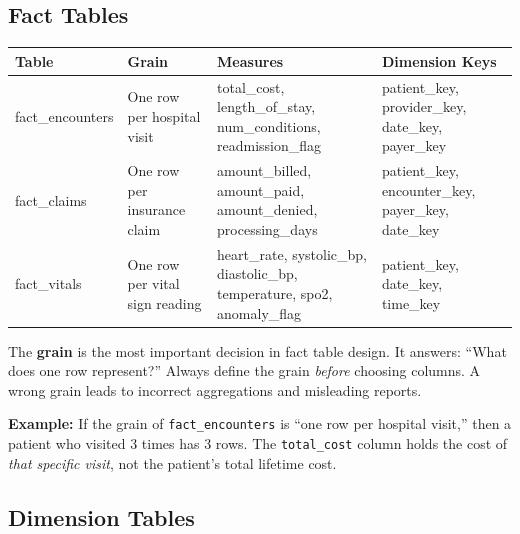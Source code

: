\documentclass[12pt, a4paper, oneside]{report}
\begin{document}
\subsection{Fact Tables}

\begin{longtable}{>{\ttfamily\small}p{3cm} p{3cm} p{3cm} p{3.5cm}}
    \toprule
    \normalfont\textbf{Table} & \textbf{Grain} & \textbf{Measures} & \textbf{Dimension Keys} \\
    \midrule
    \endhead
    fact\_encounters & One row per hospital visit & total\_cost, length\_of\_stay, num\_conditions, readmission\_flag & patient\_key, provider\_key, date\_key, payer\_key \\
    \midrule
    fact\_claims & One row per insurance claim & amount\_billed, amount\_paid, amount\_denied, processing\_days & patient\_key, encounter\_key, payer\_key, date\_key \\
    \midrule
    fact\_vitals & One row per vital sign reading & heart\_rate, systolic\_bp, diastolic\_bp, temperature, spo2, anomaly\_flag & patient\_key, date\_key, time\_key \\
    \bottomrule
\end{longtable}

\begin{notebox}
    The \textbf{grain} is the most important decision in fact table design. It answers: ``What does one row represent?'' Always define the grain \textit{before} choosing columns. A wrong grain leads to incorrect aggregations and misleading reports.

    \textbf{Example:} If the grain of \texttt{fact\_encounters} is ``one row per hospital visit,'' then a patient who visited 3 times has 3 rows. The \texttt{total\_cost} column holds the cost of \textit{that specific visit}, not the patient's total lifetime cost.
\end{notebox}

\subsection{Dimension Tables}
\end{document}
